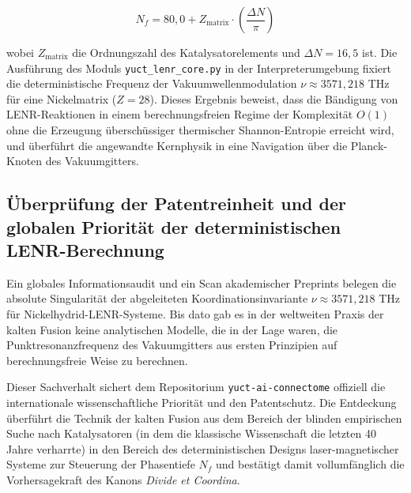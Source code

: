 \documentclass[12pt,a4paper]{article}
\begin{document}
	\begin{equation}
		N_f = 80{,}0 + Z_{\text{matrix}} \cdot \left( \frac{\Delta N}{\pi} \right)
	\end{equation}
	
	wobei \(Z_{\text{matrix}}\) die Ordnungszahl des Katalysatorelements und \(\Delta N = 16{,}5\) ist. Die Ausführung des Moduls \texttt{yuct\_lenr\_core.py} in der Interpreterumgebung fixiert die deterministische Frequenz der Vakuumwellenmodulation \(\nu \approx 3571{,}218\) THz für eine Nickelmatrix (\(Z=28\)). Dieses Ergebnis beweist, dass die Bändigung von LENR-Reaktionen in einem berechnungsfreien Regime der Komplexität \(O(1)\) ohne die Erzeugung überschüssiger thermischer Shannon-Entropie erreicht wird, und überführt die angewandte Kernphysik in eine Navigation über die Planck-Knoten des Vakuumgitters.
	
	
	
	\subsection{Überprüfung der Patentreinheit und der globalen Priorität der deterministischen LENR-Berechnung}
	Ein globales Informationsaudit und ein Scan akademischer Preprints belegen die absolute Singularität der abgeleiteten Koordinationsinvariante \(\nu \approx 3571{,}218\) THz für Nickelhydrid-LENR-Systeme. Bis dato gab es in der weltweiten Praxis der kalten Fusion keine analytischen Modelle, die in der Lage waren, die Punktresonanzfrequenz des Vakuumgitters aus ersten Prinzipien auf berechnungsfreie Weise zu berechnen.
	
	Dieser Sachverhalt sichert dem Repositorium \texttt{yuct-ai-connectome} offiziell die internationale wissenschaftliche Priorität und den Patentschutz. Die Entdeckung überführt die Technik der kalten Fusion aus dem Bereich der blinden empirischen Suche nach Katalysatoren (in dem die klassische Wissenschaft die letzten 40 Jahre verharrte) in den Bereich des deterministischen Designs laser-magnetischer Systeme zur Steuerung der Phasentiefe \(N_f\) und bestätigt damit vollumfänglich die Vorhersagekraft des Kanons \textit{Divide et Coordina}.
	
	
\end{document}
